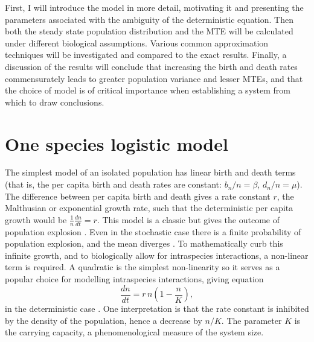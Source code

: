 First, I will introduce the model in more detail, motivating it and presenting the parameters associated with the ambiguity of the deterministic equation. 
Then both the steady state population distribution and the MTE will be calculated under different biological assumptions. 
Various common approximation techniques will be investigated and compared to the exact results. 
Finally, a discussion of the results will conclude that increasing the birth and death rates commensurately leads to greater population variance and lesser MTEs, and that the choice of model is of critical importance when establishing a system from which to draw conclusions. 
\fi


\section{One species logistic model}%

The simplest model of an isolated population has linear birth and death terms (that is, the per capita birth and death rates are constant: $b_n/n=\beta$, $d_n/n=\mu$). 
The difference between per capita birth and death gives a rate constant $r$, the Malthusian or exponential growth rate, such that the deterministic per capita growth would be $\frac{1}{n}\frac{dn}{dt} = r$. 
This model is a classic but gives the outcome of population explosion \cite{Malthus1798}. 
Even in the stochastic case there is a finite probability of population explosion, and the mean diverges \cite{Nisbet1982}. 
To mathematically curb this infinite growth, and to biologically allow for intraspecies interactions, a non-linear term is required. 
A quadratic is the simplest non-linearity so it serves as a popular choice for modelling intraspecies interactions, giving equation
\begin{equation}
\frac{dn}{dt} = r\,n\left(1-\frac{n}{K}\right),
\label{logistic}
\end{equation}
in the deterministic case \cite{Greenhalgh1990,Ovaskainen2010,Assaf2010,Allen2003a,Norden1982,Newman2004,Allen2005,Nasell2001}. %
One interpretation is that the rate constant is inhibited by the density of the population, hence a decrease by $n/K$. %
The parameter $K$ is the carrying capacity, a phenomenological measure of the system size. 

